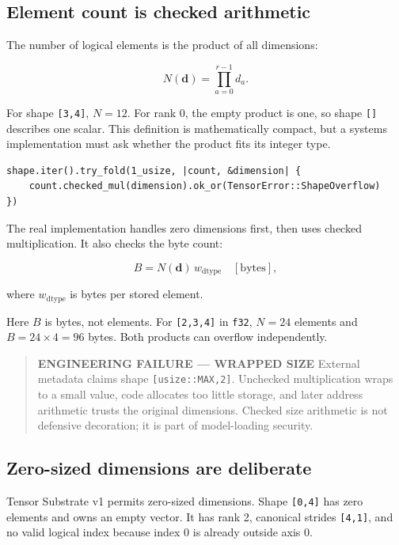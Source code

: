 \documentclass[
  10pt,
]{article}
\begin{document}
\subsection{Element count is checked
arithmetic}\label{element-count-is-checked-arithmetic}

The number of logical elements is the product of all dimensions:

\[
N(\mathbf{d}) = \prod_{a=0}^{r-1} d_a.
\]

For shape \texttt{{[}3,4{]}}, \(N=12\). For rank 0, the empty product is
one, so shape \texttt{{[}{]}} describes one scalar. This definition is
mathematically compact, but a systems implementation must ask whether
the product fits its integer type.

\begin{verbatim}
shape.iter().try_fold(1_usize, |count, &dimension| {
    count.checked_mul(dimension).ok_or(TensorError::ShapeOverflow)
})
\end{verbatim}

The real implementation handles zero dimensions first, then uses checked
multiplication. It also checks the byte count:

\[
B=N(\mathbf{d})\,w_{\mathrm{dtype}}\quad[\mathrm{bytes}],
\]

where \(w_{\mathrm{dtype}}\) is bytes per stored element.

Here \(B\) is bytes, not elements. For \texttt{{[}2,3,4{]}} in
\texttt{f32}, \(N=24\) elements and \(B=24\times4=96\) bytes. Both
products can overflow independently.

\begin{quote}
\textbf{ENGINEERING FAILURE --- WRAPPED SIZE} External metadata claims
shape \texttt{{[}usize::MAX,2{]}}. Unchecked multiplication wraps to a
small value, code allocates too little storage, and later address
arithmetic trusts the original dimensions. Checked size arithmetic is
not defensive decoration; it is part of model-loading security.
\end{quote}

\subsection{Zero-sized dimensions are
deliberate}\label{zero-sized-dimensions-are-deliberate}

Tensor Substrate v1 permits zero-sized dimensions. Shape
\texttt{{[}0,4{]}} has zero elements and owns an empty vector. It has
rank 2, canonical strides \texttt{{[}4,1{]}}, and no valid logical index
because index 0 is already outside axis 0.
\end{document}
